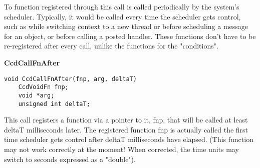 To function registered through this call is called periodically by the
system's scheduler.  Typically, it would be called every time the
scheduler gets control, such as while switching context to a new
thread or before scheduling a message for an object, or before calling
a posted handler. These functions don't have to be re-registered after
every call, unlike the functions for the "conditions". 

\vspace*{0.2in}
{\bf  CcdCallFnAfter}
\begin{verbatim}
void CcdCallFnAfter(fnp, arg, deltaT)
    CcdVoidFn fnp;
    void *arg;
    unsigned int deltaT; 
\end{verbatim}

This call registers a function via a pointer to it, fnp,  that will be
called at least deltaT milliseconds later. 
The registered function fnp is actually called the first time
scheduler gets control after deltaT milliseconds have elapsed. 
(This function may not work correctly at the moment! When corrected,
the time units may switch to seconds expressed as a "double"). 
